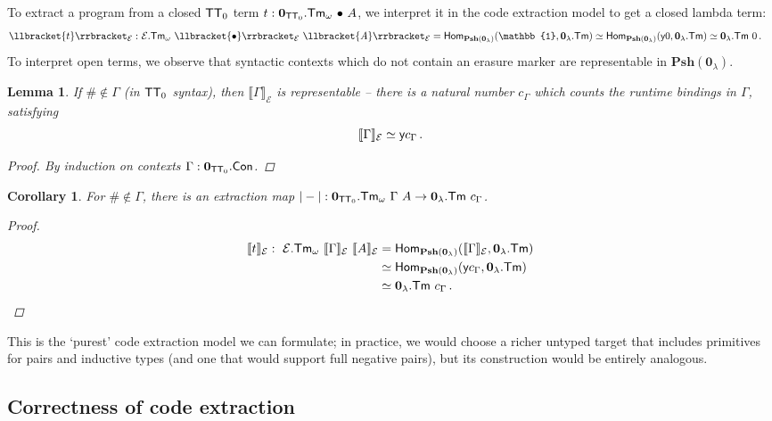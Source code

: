 \documentclass[10pt,a4paper]{article}
\newtheorem{lemma}[theorem]{Lemma}
\newtheorem{corollary}[theorem]{Corollary}
\theoremstyle{definition}
\theoremstyle{remark}
\newcommand{\s}[1]{{\ensuremath{\textsf{\upshape #1}}}\xspace}
\newcommand{\cl}[1]{{\ensuremath{\mathcal{#1}}}\xspace}
\newcommand{\re}[1]{{\ensuremath{\mathbf{#1}}}\xspace}
\newcommand{\std}[1]{\ensuremath{\mathbb{#1}}\xspace}
\newcommand{\Psh}[1]{\ensuremath{\re{Psh}({#1})}\xspace}
\newcommand{\yoneda}{\s{y}}
\newcommand{\Con}{\s{Con}}
\newcommand{\Tm}{\s{Tm}}
\newcommand{\llb}[1]{\llbracket{#1}\rrbracket}
\newcommand{\ZTT}{\ensuremath{\s{TT}_0}\xspace}
\begin{document}
To extract a program from a closed \ZTT term $t : \re 0_{\ZTT}.\Tm_\omega\ {\bullet}\ A$,
we interpret it in the code extraction model to get a closed lambda term:
\[\begin{aligned}
  \llb{t}_{\cl E} :&\ \cl{E}.\Tm_{\omega}\ \llb{\bullet}_{\cl E}\ \llb{A}_{\cl E}
    = \s{Hom}_{\Psh {\re 0_\lambda}}(\std{1}, {\re 0_\lambda}.\Tm)
    \simeq \s{Hom}_{\Psh {\re 0_\lambda}}(\yoneda 0, {\re 0_\lambda}.\Tm)
    \simeq \re 0_\lambda.\Tm\ 0 \,.
\end{aligned}\]
To interpret open terms, we observe that syntactic contexts which do not contain an
erasure marker are representable in $\Psh{\re 0_\lambda}$.
\begin{lemma}
  If $\# \not\in \Gamma$ (in \ZTT syntax), then $\llb\Gamma_{\cl E}$
  is representable -- there is a natural number $c_\Gamma$ which
  counts the runtime bindings in $\Gamma$, satisfying
  \[
    \llb\Gamma_{\cl E} \simeq \yoneda c_\Gamma \,.
  \]
  \begin{proof}
    By induction on contexts $\Gamma : \re 0_{\ZTT}.\Con$.
  \end{proof}
\end{lemma}
\begin{corollary}
  For $\# \not\in \Gamma$, there is an extraction map $|-| : \re 0_{\ZTT}.\Tm_\omega\ \Gamma\ A 
   \to \re 0_{\lambda}.\Tm\ c_\Gamma$.
  \begin{proof}
  \[\begin{aligned}
    \llb{t}_{\cl E} :\ \cl{E}.\Tm_{\omega}\ \llb\Gamma_{\cl E}\ \llb A_{\cl E}
      &= \s{Hom}_{\Psh{\re 0_\lambda}}(\llb\Gamma_{\cl E}, {\re 0_\lambda}.\Tm) \\
      &\simeq \s{Hom}_{\Psh{\re 0_\lambda}}(\yoneda c_\Gamma, {\re 0_\lambda}.\Tm) \\
      &\simeq {\re 0_\lambda}.\Tm\ c_\Gamma \,.
  \end{aligned}\]
  \end{proof}
\end{corollary}

This is the `purest' code extraction model we can formulate; in practice, we
would choose a richer untyped target that includes primitives for pairs and
inductive types (and one that would support full negative pairs), but its construction
would be entirely analogous.

\subsection{Correctness of code extraction}\label{sub:code-extr-corr}
\end{document}
